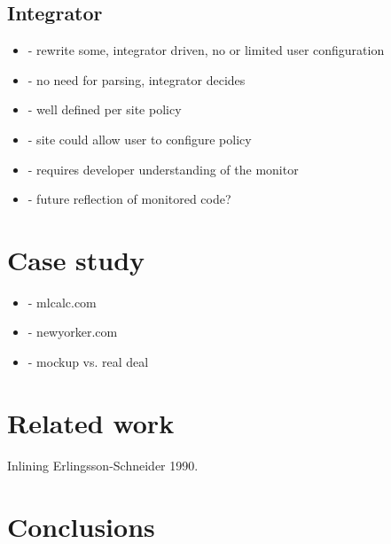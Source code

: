 \documentclass{llncs}
\begin{document}
\subsection{Integrator}

\begin{itemize}
\item- rewrite some, integrator driven, no or limited user configuration
\item- no need for parsing, integrator decides
\item- well defined per site policy
\item- site could allow user to configure policy
\item- requires developer understanding of the monitor
\item- future reflection of monitored code?
\end{itemize}


\section{Case study}
\label{sec:case}

\begin{itemize}
\item- mlcalc.com
\item- newyorker.com
\item- mockup vs. real deal
\end{itemize}

\section{Related work}
\label{sec:related}

Inlining Erlingsson-Schneider 1990.

\section{Conclusions}
\label{sec:conc}



\end{document}
